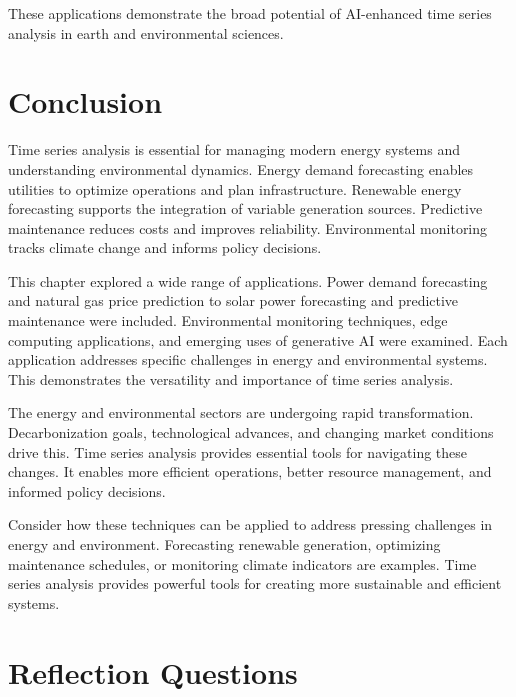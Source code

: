 These applications demonstrate the broad potential of AI-enhanced time series analysis in earth and environmental sciences.

\section{Conclusion}

Time series analysis is essential for managing modern energy systems and understanding environmental dynamics. Energy demand forecasting enables utilities to optimize operations and plan infrastructure. Renewable energy forecasting supports the integration of variable generation sources. Predictive maintenance reduces costs and improves reliability. Environmental monitoring tracks climate change and informs policy decisions.

This chapter explored a wide range of applications. Power demand forecasting and natural gas price prediction to solar power forecasting and predictive maintenance were included. Environmental monitoring techniques, edge computing applications, and emerging uses of generative AI were examined. Each application addresses specific challenges in energy and environmental systems. This demonstrates the versatility and importance of time series analysis.

The energy and environmental sectors are undergoing rapid transformation. Decarbonization goals, technological advances, and changing market conditions drive this. Time series analysis provides essential tools for navigating these changes. It enables more efficient operations, better resource management, and informed policy decisions.

Consider how these techniques can be applied to address pressing challenges in energy and environment. Forecasting renewable generation, optimizing maintenance schedules, or monitoring climate indicators are examples. Time series analysis provides powerful tools for creating more sustainable and efficient systems.

\section*{Reflection Questions}

